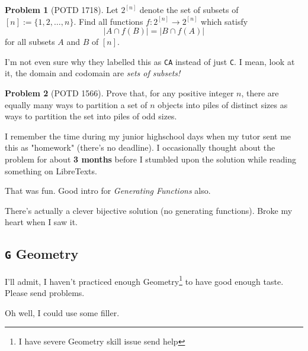 \documentclass[11pt]{article} %
\theoremstyle{definition}
\newtheorem{problem}{Problem}
\theoremstyle{remark}
\begin{document}
\begin{problem}[POTD 1718]
    Let \(2^{[n]}\) denote the set of subsets of \([n] := \{1,2,\ldots,n\}\). Find all functions \(f:2^{[n]} \rightarrow 2^{[n]}\) which satisfy \[|A \cap f(B)| = |B \cap f(A)|\] for all subsets \(A\) and \(B\) of \([n]\).
    \begin{talks}
        \begin{talk}
            I'm not even sure why they labelled this as \texttt{CA} instead of just \texttt{C}. I mean, look at it, the domain and codomain are \emph{sets of subsets!}
        \end{talk}
    \end{talks}
\end{problem}

\begin{problem}[POTD 1566]
    Prove that, for any positive integer \(n\), there are equally many ways to partition a set of \(n\) objects into piles of distinct sizes as ways to partition the set into piles of odd sizes.
    \begin{talks}
        \begin{talk}
            I remember the time during my junior highschool days when my tutor sent me this as "homework" (there's no deadline). I occasionally thought about the problem for about \textbf{3 months} before I stumbled upon the solution while reading something on LibreTexts.

            That was fun. Good intro for \emph{Generating Functions} also.
        \end{talk}
        \begin{talk}
            There's actually a clever bijective solution (no generating functions). Broke my heart when I saw it.
        \end{talk}
    \end{talks}
\end{problem}

\subsection{\texttt{G} Geometry}
\setcounter{problem}{0}

I'll admit, I haven't practiced enough Geometry\footnote{I have severe Geometry skill issue send help} to have good enough taste. Please send problems.

Oh well, I could use some filler.
\end{document}
